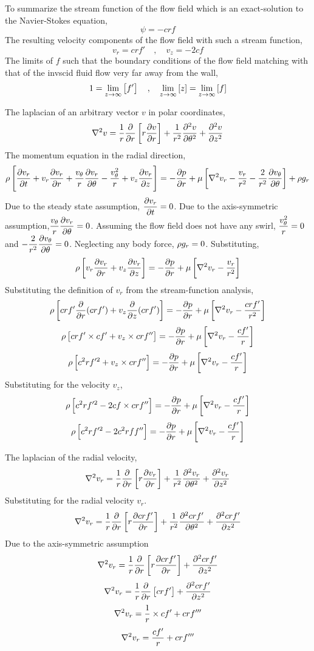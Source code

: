 \documentclass[a4paper, 12pt]{report}
\begin{document}
\begin{center}
To summarize the stream function of the flow field which is an exact-solution to the Navier-Stokes equation,
$$\psi = -crf$$
The resulting velocity components of the flow field with such a stream function,
$$v_r =  crf' \quad,\quad v_z = -2cf$$
The limits of $f$ such that the boundary conditions of the flow field matching with that of the invscid fluid flow very far away from the wall,
$$1 = \lim_{z\to\infty}\left[f'\right] \quad,\quad \lim_{z\to\infty}\left[z\right] = \lim_{z\to\infty}\left[f\right]$$



The laplacian of an arbitrary vector $v$ in polar coordinates,
$$\nabla^2 v = \frac{1}{r}\frac{\partial }{\partial r}\left[r\frac{\partial v}{\partial r}\right] + \frac{1}{r^2}\frac{\partial^2 v}{\partial \theta^2} + \frac{\partial^2 v}{\partial z^2}$$
The momentum equation in the radial direction,
$$\rho\left[\frac{\partial v_r}{\partial t}  + v_r\frac{\partial v_r}{\partial r} + \frac{v_\theta}{r}\frac{\partial v_r}{\partial \theta} - \frac{v_\theta^2}{r}  + v_z\frac{\partial v_r}{\partial z} \right] = -\frac{\partial p}{\partial r} + \mu\left[\nabla^2v_r - \frac{v_r}{r^2} - \frac{2}{r^2}\frac{\partial v_\theta}{\partial \theta}\right] + \rho g_r$$
Due to the steady state assumption, $\displaystyle{\frac{\partial v_r}{\partial t}=0}$. Due to the axis-symmetric assumption,$\displaystyle{\frac{v_\theta}{r}\frac{\partial v_r}{\partial\theta}=0}$. Assuming the flow field does not have any swirl, $\displaystyle{\frac{v_\theta^2}{r}=0}$ and $\displaystyle{- \frac{2}{r^2}\frac{\partial v_\theta}{\partial\theta}=0}$. Neglecting any body force, $\displaystyle{\rho g_r=0}$. Substituting,
$$\rho\left[v_r\frac{\partial v_r}{\partial r}  + v_z\frac{\partial v_r}{\partial z} \right] = -\frac{\partial p}{\partial r} + \mu\left[\nabla^2v_r - \frac{v_r}{r^2} \right]$$
Substituting the definition of $v_r$ from the stream-function analysis,
$$\rho\left[crf'\frac{\partial}{\partial r}(crf')  + v_z\frac{\partial}{\partial z}(crf') \right] = -\frac{\partial p}{\partial r} + \mu\left[\nabla^2v_r - \frac{crf'}{r^2} \right]$$
$$\rho\left[crf'\times cf'  + v_z\times crf'' \right] = -\frac{\partial p}{\partial r} + \mu\left[\nabla^2v_r - \frac{cf'}{r} \right]$$
$$\rho\left[c^2rf'^2  + v_z\times crf''\right] = -\frac{\partial p}{\partial r} + \mu\left[\nabla^2v_r - \frac{cf'}{r}\right]$$
Substituting for the velocity $v_z$,
$$\rho\left[c^2rf'^2 - 2cf\times crf''\right] = -\frac{\partial p}{\partial r} + \mu\left[\nabla^2v_r - \frac{cf'}{r}\right]$$
$$\rho\left[c^2rf'^2 - 2c^2rff''\right] = -\frac{\partial p}{\partial r} + \mu\left[\nabla^2v_r - \frac{cf'}{r}\right]$$

The laplacian of the radial velocity,
$$\nabla^2 v_r = \frac{1}{r}\frac{\partial }{\partial r}\left[r\frac{\partial v_r}{\partial r}\right] + \frac{1}{r^2}\frac{\partial^2 v_r}{\partial \theta^2} + \frac{\partial^2 v_r}{\partial z^2}$$
Substituting for the radial velocity $v_r$.
$$\nabla^2 v_r = \frac{1}{r}\frac{\partial }{\partial r}\left[r\frac{\partial crf'}{\partial r}\right] + \frac{1}{r^2}\frac{\partial^2 crf'}{\partial \theta^2} + \frac{\partial^2 crf'}{\partial z^2}$$
Due to the axis-symmetric assumption
$$\nabla^2 v_r = \frac{1}{r}\frac{\partial }{\partial r}\left[r\frac{\partial crf'}{\partial r}\right] + \frac{\partial^2 crf'}{\partial z^2}$$
$$\nabla^2 v_r = \frac{1}{r}\frac{\partial }{\partial r}\left[crf'\right] + \frac{\partial^2 crf'}{\partial z^2}$$
$$\nabla^2 v_r = \frac{1}{r}\times cf' + crf'''$$
$$\nabla^2 v_r = \frac{cf'}{r} + crf'''$$


\end{center}
\end{document}
